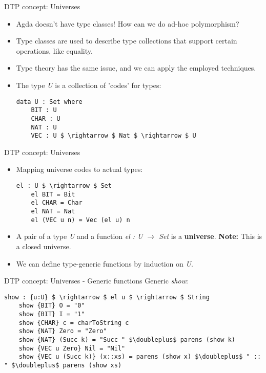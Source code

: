 \documentclass[10pt]{beamer}
\newcommand\doubleplus{+\kern-1.3ex+\kern0.8ex}
\begin{document}
\begin{frame}[fragile]{DTP concept: Universes}

\begin{itemize}
\item Agda doesn't have type classes! How can we do ad-hoc polymorphism?
\item Type classes are used to describe type collections that support certain operations, like equality.
\item Type theory has the same issue, and we can apply the employed techniques.
\item The type \textit{U} is a collection of 'codes' for types:
	\begin{lstlisting}[mathescape=true]
	data U : Set where
	BIT : U
	CHAR : U
	NAT : U
	VEC : U $ \rightarrow $ Nat $ \rightarrow $ U
	\end{lstlisting}
\end{itemize}

\end{frame}

\begin{frame}[fragile]{DTP concept: Universes}

\begin{itemize}
\item Mapping universe codes to actual types:
	\begin{lstlisting}[mathescape=true]
	el : U $ \rightarrow $ Set
	el BIT = Bit
	el CHAR = Char
	el NAT = Nat
	el (VEC u n) = Vec (el u) n
	\end{lstlisting}
\item A pair of a type \textit{U} and a function \textit{el : U $ \rightarrow $ Set} is a \textbf{universe}.
\textbf{Note:} This is a closed universe.
\item We can define type-generic functions by induction on \textit{U}.
\end{itemize}

\end{frame}

\begin{frame}[fragile]{DTP concept: Universes - Generic functions}
Generic \textit{show}:
	\begin{lstlisting}[mathescape=true]
	show : {u:U} $ \rightarrow $ el u $ \rightarrow $ String
	show {BIT} O = "0"
	show {BIT} I = "1"
	show {CHAR} c = charToString c
	show {NAT} Zero = "Zero"
	show {NAT} (Succ k) = "Succ " $\doubleplus$ parens (show k)
	show {VEC u Zero} Nil = "Nil"
	show {VEC u (Succ k)} (x::xs) = parens (show x) $\doubleplus$ " :: " $\doubleplus$ parens (show xs)
	\end{lstlisting}

\end{frame}
\end{document}
